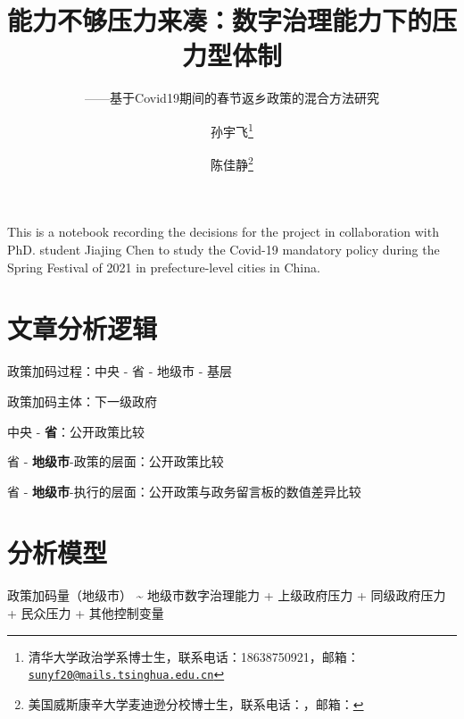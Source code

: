 \documentclass[
  12pt,
]{ctexart}
\title{能力不够压力来凑：数字治理能力下的压力型体制}
\subtitle{------基于Covid19期间的春节返乡政策的混合方法研究}
\author{孙宇飞\footnote{清华大学政治学系博士生，联系电话：18638750921，邮箱：\href{mailto:sunyf20@mails.tsinghua.edu.cn}{\nolinkurl{sunyf20@mails.tsinghua.edu.cn}}} \and 陈佳静\footnote{美国威斯康辛大学麦迪逊分校博士生，联系电话：，邮箱：}}
\date{}
\begin{document}
\maketitle

This is a notebook recording the decisions for the project in collaboration with PhD. student Jiajing Chen to study the Covid-19 mandatory policy during the Spring Festival of 2021 in prefecture-level cities in China.

\hypertarget{ux6587ux7ae0ux5206ux6790ux903bux8f91}{%
\section{文章分析逻辑}\label{ux6587ux7ae0ux5206ux6790ux903bux8f91}}

政策加码过程：中央 - 省 - 地级市 - 基层

政策加码主体：下一级政府

中央 - \textbf{省}：公开政策比较

省 - \textbf{地级市}-政策的层面：公开政策比较

省 - \textbf{地级市}-执行的层面：公开政策与政务留言板的数值差异比较

\hypertarget{ux5206ux6790ux6a21ux578b}{%
\section{分析模型}\label{ux5206ux6790ux6a21ux578b}}

政策加码量（地级市） \textasciitilde{} 地级市数字治理能力 + 上级政府压力 + 同级政府压力 + 民众压力 + 其他控制变量
\end{document}
